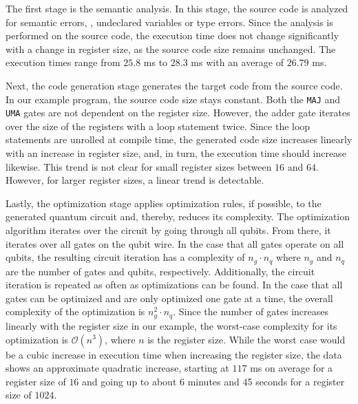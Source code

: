 The first stage is the semantic analysis. In this stage, the source code is analyzed for semantic errors, \eg, undeclared variables or type errors. Since the analysis is performed on the source code, the execution time does not change significantly with a change in register size, as the source code size remains unchanged. The execution times range from $25.8$ ms to $28.3$ ms with an average of $26.79$ ms. 

Next, the code generation stage generates the target code from the source code. In our example program, the source code size stays constant. Both the \texttt{MAJ} and \texttt{UMA} gates are not dependent on the register size. However, the adder gate iterates over the size of the registers with a loop statement twice. Since the loop statements are unrolled at compile time, the generated code size increases linearly with an increase in register size, and, in turn, the execution time should increase likewise. This trend is not clear for small register sizes between $16$ and $64$. However, for larger register sizes, a linear trend is detectable.

Lastly, the optimization stage applies optimization rules, if possible, to the generated quantum circuit and, thereby, reduces its complexity. The optimization algorithm iterates over the circuit by going through all qubits. From there, it iterates over all gates on the qubit wire. In the case that all gates operate on all qubits, the resulting circuit iteration has a complexity of $n_g \cdot n_q$ where $n_g$ and $n_q$ are the number of gates and qubits, respectively. Additionally, the circuit iteration is repeated as often as optimizations can be found. In the case that all gates can be optimized and are only optimized one gate at a time, the overall complexity of the optimization is $n_g^2 \cdot n_q$. Since the number of gates increases linearly with the register size in our example, the worst-case complexity for its optimization is $\mathcal{O}(n^3)$, where $n$ is the register size. While the worst case would be a cubic increase in execution time when increasing the register size, the data shows an approximate quadratic increase, starting at $117$ ms on average for a register size of $16$ and going up to about $6$ minutes and 45 seconds for a register size of $1024$.

